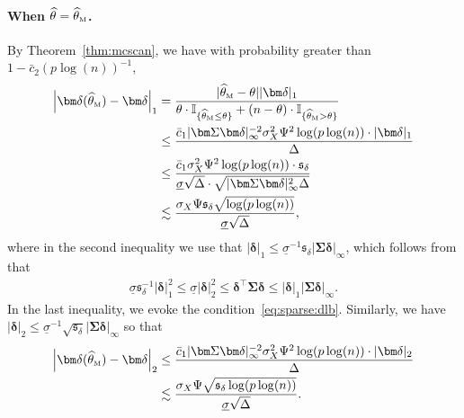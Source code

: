 \documentclass[11pt, a4paper]{article}
\renewcommand{\l}{\left}
\renewcommand{\r}{\right}
\def\wh{\widehat}
\newcommand{\cp}{\theta}
\newcommand{\Mc}{\text{\tiny \upshape M}} %
\theoremstyle{definition}
\theoremstyle{definition}
\theoremstyle{definition}
\theoremstyle{definition}
\theoremstyle{definition}
\theoremstyle{remark}
\theoremstyle{definition}
\theoremstyle{definition}
\theoremstyle{definition}
\begin{document}
\paragraph{When $\wh\cp = \wh\cp_{\Mc}$.} By Theorem~\ref{thm:mcscan}, we have with probability greater than $1 - \bar{c}_2 (p\log(n))^{-1}$,
\begin{align*}
\l\vert \bm\delta(\wh\cp_{\Mc}) - \bm\delta \r\vert_1 &= 
\frac{\vert \wh\cp_{\Mc} - \cp \vert \vert \bm\delta \vert_1}{\cp \cdot \mathbb{I}_{\{\wh\cp_{\Mc} \le \cp\}} +  (n - \cp) \cdot \mathbb{I}_{\{\wh\cp_{\Mc} > \cp\}}}
\\
&\le \frac{\bar{c}_1 \vert \bm\Sigma \bm\delta \vert_\infty^{-2} \sigma_X^2 \Psi^2 \log(p \log(n)) \cdot \vert \bm\delta \vert_1 }{ \Delta}
\\
&\le \frac{\bar{c}_1 \sigma_X^2 \Psi^2 \log(p \log(n)) \cdot \mathfrak{s}_\delta}{\underline{\sigma} \sqrt{\Delta} \cdot \sqrt{\vert \bm\Sigma \bm\delta \vert_\infty^2 \Delta}} 
\\
&\lesssim \frac{\sigma_X \Psi \mathfrak{s}_\delta \sqrt{\log(p \log(n))}}{\underline{\sigma} \sqrt{\Delta}},
\end{align*}
where in the second inequality we use that $\vert \bm\delta \vert_1 \le \underline{\sigma}^{-1} \mathfrak{s}_\delta \vert \bm\Sigma \bm\delta \vert_\infty$, which follows from that
\begin{align*}
\underline{\sigma} \mathfrak{s}_\delta^{-1} \vert \bm\delta \vert_1^2
\le \underline{\sigma} \vert \bm\delta \vert_2^2
\le \bm\delta^\top \bm\Sigma \bm\delta
\le \vert \bm\delta \vert_1 \vert \bm\Sigma \bm\delta \vert_\infty.
\end{align*}
In the last inequality, we evoke the condition~\eqref{eq:sparse:dlb}.
Similarly, we have $\vert \bm\delta \vert_2 \le \underline{\sigma}^{-1} \sqrt{\mathfrak{s}_\delta} \vert \bm\Sigma \bm\delta \vert_\infty$ so that
\begin{align*}
\l\vert \bm\delta(\wh\cp_{\Mc}) - \bm\delta \r\vert_2 &\le \frac{ \bar{c}_1 \vert \bm\Sigma \bm\delta \vert_\infty^{-2} \sigma_X^2 \Psi^2 \log(p \log(n)) \cdot \vert \bm\delta \vert_2 }{\Delta}
\\
&\lesssim \frac{\sigma_X \Psi \sqrt{\mathfrak{s}_\delta \log(p \log(n))}}{\underline{\sigma} \sqrt{\Delta}}.
\end{align*}
\end{document}
